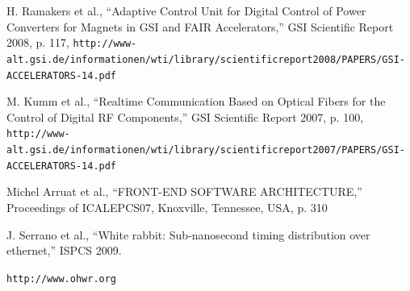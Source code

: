 \documentclass{JAC2003}
\begin{document}
\begin{thebibliography}{9}   %


H. Ramakers  et al., ``Adaptive Control Unit for Digital Control of Power Converters for Magnets in GSI and FAIR Accelerators,'' GSI Scientific Report 2008, p. 117,
\texttt{http://www-alt.gsi.de/informationen/wti/library/scientificreport2008/PAPERS/GSI-ACCELERATORS-14.pdf}

M. Kumm  et al., ``Realtime Communication Based on Optical Fibers for the Control of Digital RF Components,'' GSI Scientific Report 2007, p. 100,
\texttt{http://www-alt.gsi.de/informationen/wti/library/scientificreport2007/PAPERS/GSI-ACCELERATORS-14.pdf}

Michel Arruat  et al., ``FRONT-END SOFTWARE ARCHITECTURE,'' Proceedings of ICALEPCS07, Knoxville, Tennessee, USA, p. 310

J. Serrano et al., ``White rabbit: Sub-nanosecond timing distribution over ethernet,'' ISPCS 2009.

\texttt{http://www.ohwr.org}




\end{thebibliography}
\end{document}
